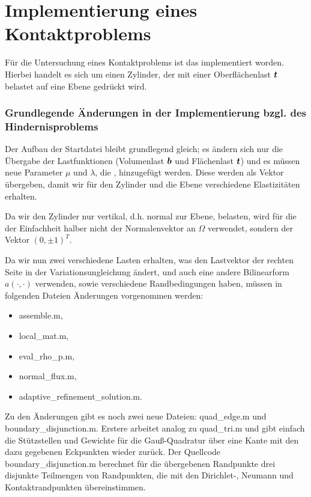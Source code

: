 \section{Implementierung eines Kontaktproblems}
\label{kap:5.2}

Für die Untersuchung eines Kontaktproblems ist das \textit{} implementiert worden. Hierbei handelt es sich um einen Zylinder, der mit einer Oberflächenlast $\boldsymbol t$ belastet auf eine Ebene gedrückt wird.

\subsubsection{Grundlegende Änderungen in der Implementierung bzgl. des Hindernisproblems}

Der Aufbau der Startdatei bleibt grundlegend gleich; es ändern sich nur die Übergabe der Lastfunktionen (Volumenlast $\boldsymbol b$ und Flächenlast $\boldsymbol t$) und es müssen neue Parameter $\mu$ und $\lambda$, die , hinzugefügt werden. Diese werden als Vektor übergeben, damit wir für den Zylinder und die Ebene verschiedene Elastizitäten erhalten.

Da wir den Zylinder nur vertikal, d.h. normal zur Ebene, belasten, wird für die  der Einfachheit halber nicht der Normalenvektor an $\Omega$ verwendet, sondern der Vektor $(0,\pm 1)^T$.

Da wir nun zwei verschiedene Lasten erhalten, was den Lastvektor der rechten Seite in der Variationsungleichung ändert, und auch eine andere Bilinearform $a(\cdot,\cdot)$ verwenden, sowie verschiedene Randbedingungen haben, müssen in folgenden Dateien Änderungen vorgenommen werden:
\begin{itemize}
\item {\ttfamily assemble.m},
\item {\ttfamily local_mat.m},
\item {\ttfamily eval_rho_p.m},
\item {\ttfamily normal_flux.m},
\item {\ttfamily adaptive_refinement_solution.m}.
\end{itemize}

Zu den Änderungen gibt es noch zwei neue Dateien: {\ttfamily quad_edge.m} und {\ttfamily boundary_disjunction.m}. Erstere arbeitet analog zu {\ttfamily quad_tri.m} und gibt einfach die Stützstellen und Gewichte für die Gauß-Quadratur über eine Kante mit den dazu gegebenen Eckpunkten wieder zurück. Der Quellcode {\ttfamily boundary_disjunction.m} berechnet für die übergebenen Randpunkte drei disjunkte Teilmengen von Randpunkten, die mit den Dirichlet-, Neumann und Kontaktrandpunkten übereinstimmen.

